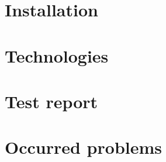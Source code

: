 \documentclass[11pt, a4paper]{article}
\begin{document}
\section{Installation}

\section{Technologies}


\section{Test report}
\section{Occurred problems}
{}

\end{document}
